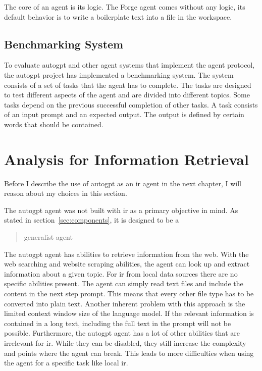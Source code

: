 \documentclass[../main.tex]{subfiles}
\begin{document}
The core of an agent is its logic.
The Forge agent comes without any logic,
its default behavior is to write a boilerplate text into a file in the workspace.

\subsection{Benchmarking System}
\label{subsec:benchmarking}

To evaluate \gls{autogpt} and other agent systems that implement the agent protocol,
the \gls{autogpt} project has implemented a benchmarking system.
The system consists of a set of tasks that the agent has to complete.
The tasks are designed to test different aspects of the agent and are divided into different topics.
Some tasks depend on the previous successful completion of other tasks.
A task consists of an input prompt and an expected output.
The output is defined by certain words that should be contained.

\section{Analysis for Information Retrieval}
\label{sec:analysis}

Before I describe the use of \gls{autogpt} as an \gls{ir} agent in the next chapter,
I will reason about my choices in this section.

The \gls{autogpt} agent was not built with \gls{ir} as a primary objective in mind.
As stated in section~\ref{sec:components}, it is designed to be a \blockquote{generalist agent}.
The \gls{autogpt} agent has abilities to retrieve information from the web.
With the web searching and website scraping abilities, the agent can
look up and extract information about a given topic.
For \gls{ir} from local data sources there are no specific abilities present.
The agent can simply read text files and include the content in the next step prompt.
This means that every other file type has to be converted into plain text.
Another inherent problem with this approach is the limited context window size of the language model.
If the relevant information is contained in a long text, including the full text
in the prompt will not be possible.
Furthermore, the \gls{autogpt} agent has a lot of other abilities that are irrelevant
for \gls{ir}.
While they can be disabled, they still increase the complexity and points where the agent
can break.
This leads to more difficulties when using the agent for a specific task
like local \gls{ir}.
\end{document}
